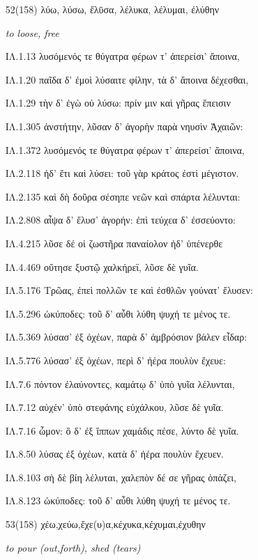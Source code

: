 \begin{enumerate}
{}

\clearpage
\item[\large 52(158)]{\large\g λύω, λύσω, ἔλῡσα, λέλυκα, λέλυμαι, ἐλύθην}

\hspace{0.2cm} \textit{ to loose, free}

{\g
ΙΛ.1.13 λυσόμενός τε θύγατρα φέρων τ' ἀπερείσι' ἄποινα,

ΙΛ.1.20 παῖδα δ' ἐμοὶ λύσαιτε φίλην, τὰ δ' ἄποινα δέχεσθαι,

ΙΛ.1.29 τὴν δ' ἐγὼ οὐ λύσω: πρίν μιν καὶ γῆρας ἔπεισιν

ΙΛ.1.305 ἀνστήτην, λῦσαν δ' ἀγορὴν παρὰ νηυσὶν Ἀχαιῶν:

ΙΛ.1.372 λυσόμενός τε θύγατρα φέρων τ' ἀπερείσι' ἄποινα,

ΙΛ.2.118 ἠδ' ἔτι καὶ λύσει: τοῦ γὰρ κράτος ἐστὶ μέγιστον.

ΙΛ.2.135 καὶ δὴ δοῦρα σέσηπε νεῶν καὶ σπάρτα λέλυνται:

ΙΛ.2.808 αἶψα δ' ἔλυσ' ἀγορήν: ἐπὶ τεύχεα δ' ἐσσεύοντο:

ΙΛ.4.215 λῦσε δέ οἱ ζωστῆρα παναίολον ἠδ' ὑπένερθε

ΙΛ.4.469 οὔτησε ξυστῷ χαλκήρεϊ, λῦσε δὲ γυῖα.

ΙΛ.5.176 Τρῶας, ἐπεὶ πολλῶν τε καὶ ἐσθλῶν γούνατ' ἔλυσεν:

ΙΛ.5.296 ὠκύποδες: τοῦ δ' αὖθι λύθη ψυχή τε μένος τε.

ΙΛ.5.369 λύσασ' ἐξ ὀχέων, παρὰ δ' ἀμβρόσιον βάλεν εἶδαρ:

ΙΛ.5.776 λύσασ' ἐξ ὀχέων, περὶ δ' ἠέρα πουλὺν ἔχευε:

ΙΛ.7.6 πόντον ἐλαύνοντες, καμάτῳ δ' ὑπὸ γυῖα λέλυνται,

ΙΛ.7.12 αὐχέν' ὑπὸ στεφάνης εὐχάλκου, λῦσε δὲ γυῖα.

ΙΛ.7.16 ὦμον: ὃ δ' ἐξ ἵππων χαμάδις πέσε, λύντο δὲ γυῖα.

ΙΛ.8.50 λύσας ἐξ ὀχέων, κατὰ δ' ἠέρα πουλὺν ἔχευεν.

ΙΛ.8.103 σὴ δὲ βίη λέλυται, χαλεπὸν δέ σε γῆρας ὀπάζει,

ΙΛ.8.123 ὠκύποδες: τοῦ δ' αὖθι λύθη ψυχή τε μένος τε.

}

\clearpage
\item[\large 53(158)]{\large \g   χέω,χεύω,ἔχε(υ)α,κέχυκα,κέχυμαι,ἐχυθην   }

\hspace{0.2cm} \textit{ to pour (out,forth), shed (tears)  }


\end{enumerate}
